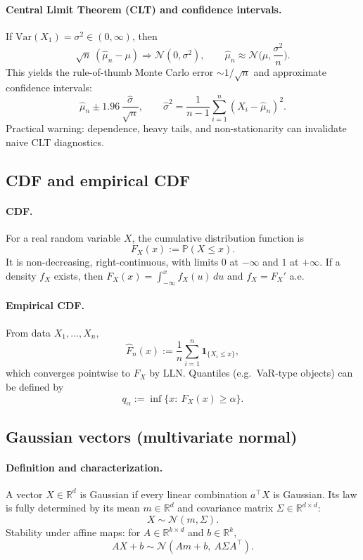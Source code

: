 \documentclass[11pt]{article}
\newcommand{\R}{\mathbb{R}}
\newcommand{\Pbb}{\mathbb{P}}
\newcommand{\Var}{\mathrm{Var}}
\newcommand{\1}{\mathbf{1}}
\theoremstyle{plain}
\theoremstyle{definition}
\theoremstyle{remark}
\begin{document}
\paragraph{Central Limit Theorem (CLT) and confidence intervals.}
If $\Var(X_1)=\sigma^2\in(0,\infty)$, then
\[
\sqrt{n}\,(\widehat\mu_n-\mu)\Rightarrow \mathcal N(0,\sigma^2),
\qquad
\widehat\mu_n\approx \mathcal N\!\Big(\mu,\frac{\sigma^2}{n}\Big).
\]
This yields the rule-of-thumb Monte Carlo error $\sim 1/\sqrt{n}$ and approximate confidence intervals:
\[
\widehat\mu_n \pm 1.96\,\frac{\widehat\sigma}{\sqrt{n}},
\qquad
\widehat\sigma^2=\frac{1}{n-1}\sum_{i=1}^n (X_i-\widehat\mu_n)^2.
\]
Practical warning: dependence, heavy tails, and non-stationarity can invalidate naive CLT diagnostics.

\subsection{CDF and empirical CDF}

\paragraph{CDF.}
For a real random variable $X$, the cumulative distribution function is
\[
F_X(x):=\Pbb(X\le x).
\]
It is non-decreasing, right-continuous, with limits $0$ at $-\infty$ and $1$ at $+\infty$.
If a density $f_X$ exists, then $F_X(x)=\int_{-\infty}^x f_X(u)\,du$ and $f_X=F_X'$ a.e.

\paragraph{Empirical CDF.}
From data $X_1,\dots,X_n$,
\[
\widehat F_n(x):=\frac1n\sum_{i=1}^n \mathbf 1_{\{X_i\le x\}},
\]
which converges pointwise to $F_X$ by LLN.
Quantiles (e.g.\ VaR-type objects) can be defined by
\[
q_\alpha:=\inf\{x:\ F_X(x)\ge \alpha\}.
\]

\subsection{Gaussian vectors (multivariate normal)}

\paragraph{Definition and characterization.}
A vector $X\in\R^d$ is Gaussian if every linear combination $a^\top X$ is Gaussian.
Its law is fully determined by its mean $m\in\R^d$ and covariance matrix $\Sigma\in\R^{d\times d}$:
\[
X\sim\mathcal N(m,\Sigma).
\]
Stability under affine maps: for $A\in\R^{k\times d}$ and $b\in\R^k$,
\[
AX+b\sim \mathcal N(Am+b,\ A\Sigma A^\top).
\]
\end{document}
